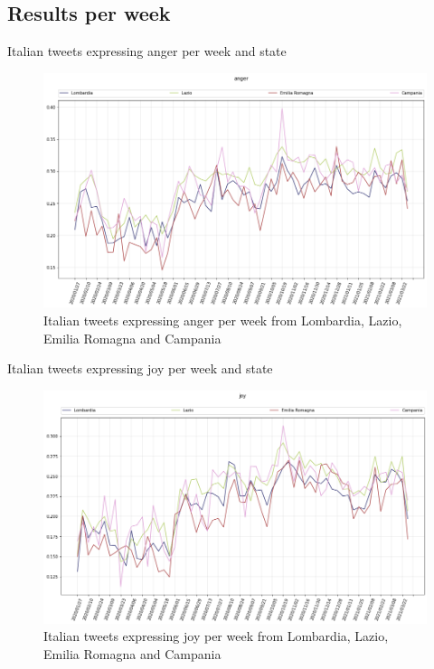 \documentclass[8pt]{beamer}  %
\begin{document}
\subsection{Results per week}

\begin{frame}{Italian tweets expressing anger per week and state}
    
    \begin{figure}
        \centering
        \includegraphics[scale=0.3]{assets/img/it_states_anger.png}
        \caption{Italian tweets expressing anger per week from Lombardia, Lazio, Emilia Romagna and Campania}
        \label{fig:it_states_anger}
    \end{figure}
    
\end{frame}

\begin{frame}{Italian tweets expressing joy per week and state}
    
    \begin{figure}
        \centering
        \includegraphics[scale=0.3]{assets/img/it_states_joy.png}
        \caption{Italian tweets expressing joy per week from Lombardia, Lazio, Emilia Romagna and Campania}
        \label{fig:it_states_joy}
    \end{figure}
    
\end{frame}
\end{document}
